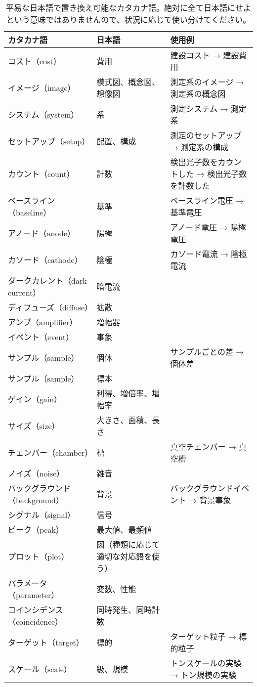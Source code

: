 \begin{table}
  \centering
  \caption{平易な日本語で置き換え可能なカタカナ語。絶対に全て日本語にせよという意味ではありませんので、状況に応じて使い分けてください。}
  \begin{tabular}{lll}
    \hline
    カタカナ語 & 日本語 & 使用例 \\
    \hline
    コスト（cost） & 費用 & 建設コスト → 建設費用 \\
    イメージ（image） & 模式図、概念図、想像図 & 測定系のイメージ → 測定系の概念図 \\
    システム（system） & 系 & 測定システム → 測定系 \\
    セットアップ（setup） & 配置、構成 & 測定のセットアップ → 測定系の構成 \\
    カウント（count） & 計数 & 検出光子数をカウントした → 検出光子数を計数した \\
    ベースライン（baseline） & 基準 & ベースライン電圧 → 基準電圧 \\
    アノード（anode） & 陽極 & アノード電圧 → 陽極電圧 \\
    カソード（cathode） & 陰極 & カソード電流 → 陰極電流 \\
    ダークカレント（dark current） & 暗電流 & \\
    ディフューズ（diffuse） & 拡散 & \\
    アンプ（amplifier） & 増幅器 & \\
    イベント（event） & 事象 & \\
    サンプル（sample） & 個体 & サンプルごとの差 → 個体差 \\
    サンプル（sample） & 標本 & \\
    ゲイン（gain） & 利得、増倍率、増幅率 & \\
    サイズ（size） & 大きさ、面積、長さ & \\
    チェンバー（chamber） & 槽 & 真空チェンバー → 真空槽 \\
    ノイズ（noise） & 雑音 &  \\
    バックグラウンド（background） & 背景 & バックグラウンドイベント → 背景事象 \\
    シグナル（signal） & 信号 &  \\
    ピーク（peak） & 最大値、最頻値 &  \\
    プロット（plot） & 図（種類に応じて適切な対応語を使う） &  \\
    パラメータ（parameter） & 変数、性能 &  \\
    コインシデンス（coincidence） & 同時発生、同時計数 &  \\
    ターゲット（target） & 標的 & ターゲット粒子 → 標的粒子 \\
    スケール（scale） & 級、規模 & トンスケールの実験 → トン規模の実験 \\
    \hline
  \end{tabular}
  \label{katakana}
\end{table}

